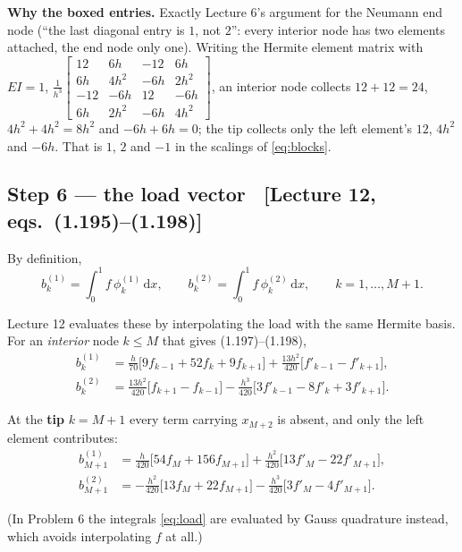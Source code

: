 \documentclass[11pt]{article}
\newcommand{\dx}{\,\mathrm{d}x}
\newcommand{\src}[1]{{\small\color{black!55}\textsf{[#1]}}}
\begin{document}
\medskip
{\small\color{black!60}\textbf{Why the boxed entries.}  Exactly Lecture 6's
argument for the Neumann end node (``the last diagonal entry is $1$, not $2$'':
every interior node has two elements attached, the end node only one).  Writing
the Hermite element matrix with $EI=1$,
$\frac{1}{h^{3}}\left[\begin{smallmatrix}12&6h&-12&6h\\6h&4h^{2}&-6h&2h^{2}\\
-12&-6h&12&-6h\\6h&2h^{2}&-6h&4h^{2}\end{smallmatrix}\right]$,
an interior node collects $12+12=24$, $4h^{2}+4h^{2}=8h^{2}$ and
$-6h+6h=0$; the tip collects only the left element's $12$, $4h^{2}$ and $-6h$.
That is $\boxed{1}$, $\boxed{2}$ and $\boxed{-1}$ in the scalings of
\eqref{eq:blocks}.}

\subsection*{Step 6 --- the load vector
  \ \src{Lecture 12, eqs.~(1.195)--(1.198)}}

\begin{steps}
\item By definition,
\begin{equation}\label{eq:load}
  b^{(1)}_{k}=\int_{0}^{1}f\,\phi^{(1)}_{k}\dx,
  \qquad
  b^{(2)}_{k}=\int_{0}^{1}f\,\phi^{(2)}_{k}\dx,
  \qquad k=1,\dots,M+1 .
\end{equation}
\item Lecture 12 evaluates these by interpolating the load with the same Hermite
      basis.  For an \emph{interior} node $k\le M$ that gives (1.197)--(1.198),
\begin{align*}
  b^{(1)}_{k}&=\tfrac{h}{70}\bigl[9f_{k-1}+52f_{k}+9f_{k+1}\bigr]
             +\tfrac{13h^{2}}{420}\bigl[f'_{k-1}-f'_{k+1}\bigr],\\
  b^{(2)}_{k}&=\tfrac{13h^{2}}{420}\bigl[f_{k+1}-f_{k-1}\bigr]
             -\tfrac{h^{3}}{420}\bigl[3f'_{k-1}-8f'_{k}+3f'_{k+1}\bigr].
\end{align*}
\item At the \textbf{tip} $k=M+1$ every term carrying $x_{M+2}$ is absent, and
      only the left element contributes:
\begin{align*}
  b^{(1)}_{M+1}&=\tfrac{h}{420}\bigl[54f_{M}+156f_{M+1}\bigr]
             +\tfrac{h^{2}}{420}\bigl[13f'_{M}-22f'_{M+1}\bigr],\\
  b^{(2)}_{M+1}&=-\tfrac{h^{2}}{420}\bigl[13f_{M}+22f_{M+1}\bigr]
             -\tfrac{h^{3}}{420}\bigl[3f'_{M}-4f'_{M+1}\bigr].
\end{align*}
\item (In Problem 6 the integrals \eqref{eq:load} are evaluated by Gauss
      quadrature instead, which avoids interpolating $f$ at all.)
\end{steps}
\end{document}
